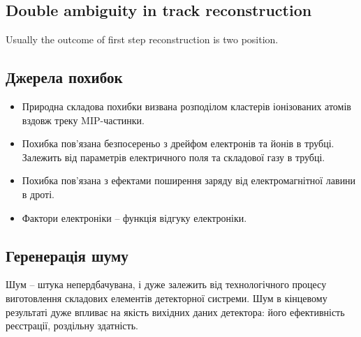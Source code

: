 \documentclass[]{article}
\begin{document}
	\subsection{ Double ambiguity in track reconstruction}
	Usually the outcome of first step reconstruction is two position.
	
	
	
	\subsection{Джерела похибок}
	
	\begin{itemize}
		\item Природна складова похибки визвана розподілом кластерів іонізованих атомів вздовж треку MIP-частинки.\par
		\item Похибка пов’язана безпосереньо з дрейфом електронів та йонів в трубці. Залежить від параметрів електричного поля та складової газу в трубці.
		\item Похибка пов’язана з ефектами поширення заряду від електромагнітної лавини в дроті.
		\item Фактори електроніки -- функція відгуку електроніки.
	\end{itemize}
	
	\subsection{Геренерація шуму}
	Шум -- штука непердбачувана, і дуже залежить від технологічного процесу виготовлення складових елементів детекторної систреми. Шум в кінцевому результаті дуже впливає на якість вихідних даних детектора: його ефективність реєстрації, роздільну здатність.
	
\end{document}

